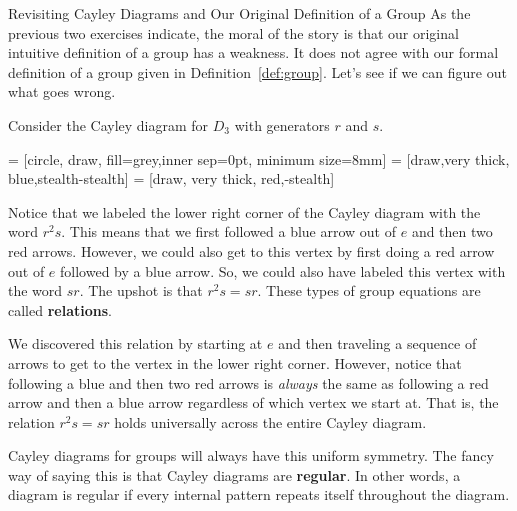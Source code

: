 \begin{section}{Revisiting Cayley Diagrams and Our Original Definition of a Group}
As the previous two exercises indicate, the moral of the story is that our original intuitive definition of a group has a weakness.  It does not agree with our formal definition of a group given in Definition~\ref{def:group}.  Let's see if we can figure out what goes wrong.

Consider the Cayley diagram for $D_3$ with generators $r$ and $s$.

 = [circle, draw, fill=grey,inner sep=0pt, minimum size=8mm]
 = [draw,very  thick, blue,stealth-stealth]
 = [draw, very thick, red,-stealth]

\begin{center}
\end{center}

\noindent Notice that we labeled the lower right corner of the Cayley diagram with the word $r^2s$.  This means that we first followed a blue arrow out of $e$ and then two red arrows.  However, we could also get to this vertex by first doing a red arrow out of $e$ followed by a blue arrow.  So, we could also have labeled this vertex with the word $sr$.  The upshot is that $r^2s=sr$.  These types of group equations are called \textbf{relations}.

We discovered this relation by starting at $e$ and then traveling a sequence of arrows to get to the vertex in the lower right corner.  However, notice that following a blue and then two red arrows is \emph{always} the same as following a red arrow and then a blue arrow regardless of which vertex we start at.  That is, the relation $r^2s=sr$ holds universally across the entire Cayley diagram.

Cayley diagrams for groups will always have this uniform symmetry.  The fancy way of saying this is that Cayley diagrams are \textbf{regular}.  In other words, a diagram is regular if every internal pattern repeats itself throughout the diagram.


\end{section}
